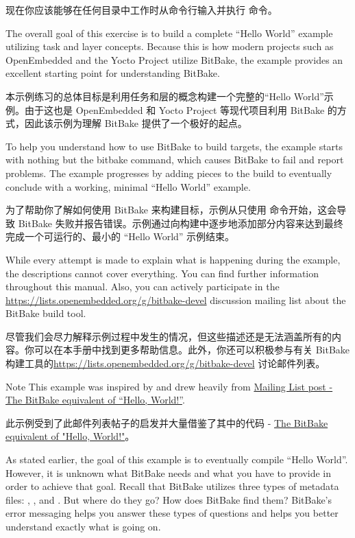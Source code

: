 现在你应该能够在任何目录中工作时从命令行输入并执行  命令。


The overall goal of this exercise is to build a complete “Hello World” example utilizing task and layer concepts. Because this is how modern projects such as OpenEmbedded and the Yocto Project utilize BitBake, the example provides an excellent starting point for understanding BitBake.

本示例练习的总体目标是利用任务和层的概念构建一个完整的“Hello World”示例。由于这也是 OpenEmbedded 和 Yocto Project 等现代项目利用 BitBake 的方式，因此该示例为理解 BitBake 提供了一个极好的起点。

To help you understand how to use BitBake to build targets, the example starts with nothing but the bitbake command, which causes BitBake to fail and report problems. The example progresses by adding pieces to the build to eventually conclude with a working, minimal “Hello World” example.

为了帮助你了解如何使用 BitBake 来构建目标，示例从只使用  命令开始，这会导致 BitBake 失败并报告错误。示例通过向构建中逐步地添加部分内容来达到最终完成一个可运行的、最小的 ``Hello World'' 示例结束。

While every attempt is made to explain what is happening during the example, the descriptions cannot cover everything. You can find further information throughout this manual. Also, you can actively participate in the \url{https://lists.openembedded.org/g/bitbake-devel} discussion mailing list about the BitBake build tool.

尽管我们会尽力解释示例过程中发生的情况，但这些描述还是无法涵盖所有的​​内容。你可以在本手册中找到更多帮助信息。此外，你还可以积极参与有关 BitBake 构建工具的\url{https://lists.openembedded.org/g/bitbake-devel} 讨论邮件列表。

\begin{noteblock}{Note}%
This example was inspired by and drew heavily from \href{https://www.mail-archive.com/yocto@yoctoproject.org/msg09379.html}{Mailing List post - The BitBake equivalent of “Hello, World!”}.

\medskip
此示例受到了此邮件列表帖子的启发并大量借鉴了其中的代码 - \href{https://www.mail-archive.com/yocto@yoctoproject.org/msg09379.html}{The BitBake equivalent of "Hello, World!"}。
\end{noteblock}

As stated earlier, the goal of this example is to eventually compile “Hello World”. However, it is unknown what BitBake needs and what you have to provide in order to achieve that goal. Recall that BitBake utilizes three types of metadata files: , , and . But where do they go? How does BitBake find them? BitBake’s error messaging helps you answer these types of questions and helps you better understand exactly what is going on.

